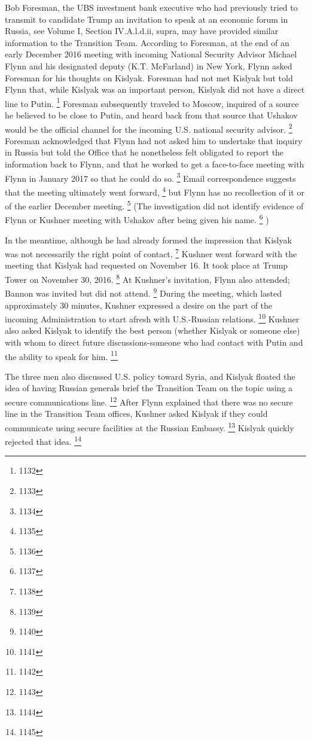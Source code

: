 Bob Foresman, the UBS investment bank executive who had previously tried to transmit to candidate Trump an invitation to speak at an economic forum in Russia, see Volume I, Section IV.A.l.d.ii, supra, may have provided similar information to the Transition Team.
According to Foresman, at the end of an early December 2016 meeting with incoming National Security Advisor Michael Flynn and his designated deputy (K.T. McFarland) in New York, Flynn asked Foresman for his thoughts on Kislyak.
Foresman had not met Kislyak but told Flynn that, while Kislyak was an important person, Kislyak did not have a direct line to Putin.%
\footnote{1132}
Foresman subsequently traveled to Moscow, inquired of a source he believed to be close to Putin, and heard back from that source that Ushakov would be the official channel for the incoming U.S. national security advisor.%
\footnote{1133}
Foresman acknowledged that Flynn had not asked him to undertake that inquiry in Russia but told the Office that he nonetheless felt obligated to report the information back to Flynn, and that he worked to get a face-to-face meeting with Flynn in January 2017 so that he could do so.%
\footnote{1134}
Email correspondence suggests that the meeting ultimately went forward,%
\footnote{1135}
but Flynn has no recollection of it or of the earlier December meeting.%
\footnote{1136}
(The investigation did not identify evidence of Flynn or Kushner meeting with Ushakov after being given his name.%
\footnote{1137}
)

In the meantime, although he had already formed the impression that Kislyak was not necessarily the right point of contact,%
\footnote{1138}
Kushner went forward with the meeting that Kislyak had requested on November 16. It took place at Trump Tower on November 30, 2016.%
\footnote{1139}
At Kushner's invitation, Flynn also attended; Bannon was invited but did not attend.%
\footnote{1140}
During the meeting, which lasted approximately 30 minutes, Kushner expressed a desire on the part of the incoming Administration to start afresh with U.S.-Russian relations.%
\footnote{1141}
Kushner also asked Kislyak to identify the best person (whether Kislyak or someone else) with whom to direct future discussions-someone who had contact with Putin and the ability to speak for him.%
\footnote{1142}

The three men also discussed U.S. policy toward Syria, and Kislyak floated the idea of having Russian generals brief the Transition Team on the topic using a secure communications line.%
\footnote{1143}
After Flynn explained that there was no secure line in the Transition Team offices, Kushner asked Kislyak if they could communicate using secure facilities at the Russian Embassy.%
\footnote{1144}
Kislyak quickly rejected that idea.%
\footnote{1145}

